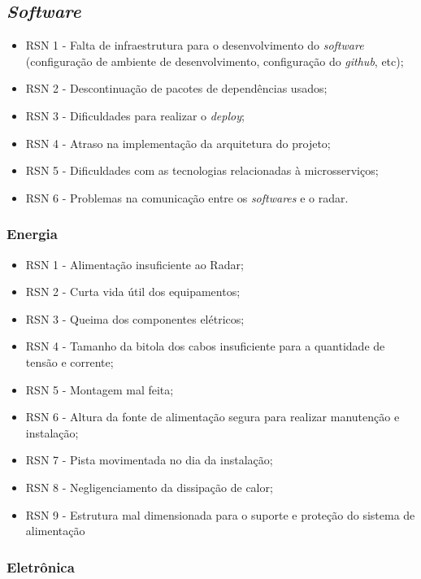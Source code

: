 \subsection{\emph{Software}}
\begin{itemize}
    \item RSN 1 - Falta de infraestrutura para o desenvolvimento do \emph{software} (configuração de ambiente de desenvolvimento, configuração do \emph{github}, etc);
    \item RSN 2 - Descontinuação de pacotes de dependências usados;
    \item RSN 3 - Dificuldades para realizar o \emph{deploy};
    \item RSN 4 - Atraso na implementação da arquitetura do projeto;
    \item RSN 5 - Dificuldades com as tecnologias relacionadas à microsserviços;
    \item RSN 6 - Problemas na comunicação entre os \emph{softwares} e o radar.
\end{itemize}

\subsubsection{Energia}
\begin{itemize}
   \item RSN 1 - Alimentação insuficiente ao Radar;
   \item RSN 2 - Curta vida útil dos equipamentos; 
   \item RSN 3 - Queima dos componentes elétricos;
   \item RSN 4 - Tamanho da bitola dos cabos insuficiente para a quantidade de tensão e corrente;
   \item RSN 5 - Montagem mal feita;
   \item RSN 6 - Altura da fonte de alimentação segura para realizar manutenção e instalação;
   \item RSN 7 - Pista movimentada no dia da instalação;
   \item RSN 8 - Negligenciamento da dissipação de calor;
   \item RSN 9 - Estrutura mal dimensionada para o suporte e proteção do sistema de alimentação
\end{itemize}

\subsubsection{Eletrônica}

